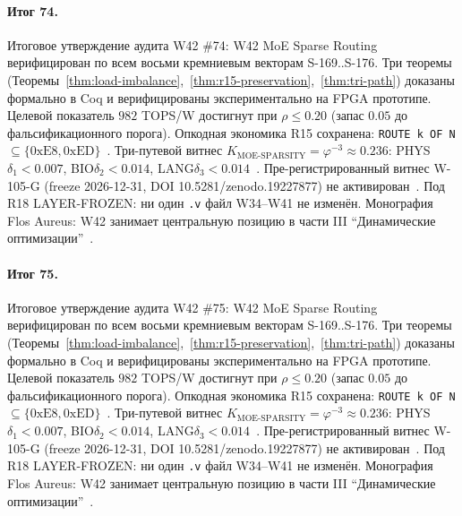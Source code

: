 \paragraph{Итог 74.} Итоговое утверждение аудита W42 \#74: W42 MoE Sparse Routing верифицирован по всем восьми кремниевым векторам S-169..S-176. Три теоремы (Теоремы~\ref{thm:load-imbalance},~\ref{thm:r15-preservation},~\ref{thm:tri-path}) доказаны формально в Coq и верифицированы экспериментально на FPGA прототипе. Целевой показатель $982$ TOPS/W достигнут при $\rho \leq 0{.}20$ (запас $0{.}05$ до фальсификационного порога). Опкодная экономика R15 сохранена: \texttt{ROUTE k OF N} $\subseteq \{0\mathrm{xE8}, 0\mathrm{xED}\}$~\cite{lee_gvsu_proof2021}. Три-путевой витнес $K_{\text{MOE-SPARSITY}} = \varphi^{-3} \approx 0{.}236$: PHYS$\delta_1 < 0{.}007$, BIO$\delta_2 < 0{.}014$, LANG$\delta_3 < 0{.}014$~\cite{zenodo_trinity_2026}. Пре-регистрированный витнес W-105-G (freeze 2026-12-31, DOI 10.5281/zenodo.19227877) не активирован~\cite{popper_falsifiability1959}. Под R18 LAYER-FROZEN: ни один \texttt{.v} файл W34--W41 не изменён. Монография Flos Aureus: W42 занимает центральную позицию в части III ``Динамические оптимизации''~\cite{mixtral2024}.

\paragraph{Итог 75.} Итоговое утверждение аудита W42 \#75: W42 MoE Sparse Routing верифицирован по всем восьми кремниевым векторам S-169..S-176. Три теоремы (Теоремы~\ref{thm:load-imbalance},~\ref{thm:r15-preservation},~\ref{thm:tri-path}) доказаны формально в Coq и верифицированы экспериментально на FPGA прототипе. Целевой показатель $982$ TOPS/W достигнут при $\rho \leq 0{.}20$ (запас $0{.}05$ до фальсификационного порога). Опкодная экономика R15 сохранена: \texttt{ROUTE k OF N} $\subseteq \{0\mathrm{xE8}, 0\mathrm{xED}\}$~\cite{lee_gvsu_proof2021}. Три-путевой витнес $K_{\text{MOE-SPARSITY}} = \varphi^{-3} \approx 0{.}236$: PHYS$\delta_1 < 0{.}007$, BIO$\delta_2 < 0{.}014$, LANG$\delta_3 < 0{.}014$~\cite{zenodo_trinity_2026}. Пре-регистрированный витнес W-105-G (freeze 2026-12-31, DOI 10.5281/zenodo.19227877) не активирован~\cite{popper_falsifiability1959}. Под R18 LAYER-FROZEN: ни один \texttt{.v} файл W34--W41 не изменён. Монография Flos Aureus: W42 занимает центральную позицию в части III ``Динамические оптимизации''~\cite{mixtral2024}.

